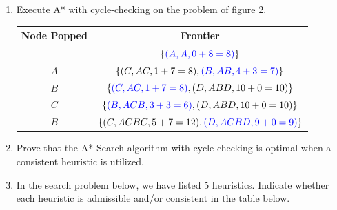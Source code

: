\begin{enumerate}
    \item Execute A* with cycle-checking on the problem of figure 2.

    \begin{solution} \begin{table}[ht!] \color{primary}
        \centering
        \renewcommand{\arraystretch}{1.15}

        \begin{tabular}{||c|c||}
            \hline
            Node Popped & Frontier                                                \\ \hline \hline
                        & $\{ {\color{blue}(A,A, 0+8=8)} \}$                      \\ \hline
            $A$         & $\{ (C,AC, 1+7=8), {\color{blue}(B,AB, 4+3=7)} \}$      \\ \hline
            $B$         & $\{ {\color{blue}(C,AC, 1+7=8)}, (D,ABD, 10+0=10) \}$   \\ \hline
            $C$         & $\{ {\color{blue}(B,ACB, 3+3=6)}, (D,ABD, 10+0=10) \}$  \\ \hline
            $B$         & $\{ (C,ACBC, 5+7=12), {\color{blue}(D,ACBD, 9+0=9)} \}$ \\ \hline
        \end{tabular}
    \end{table} \end{solution}

    \item Prove that the A* Search algorithm with cycle-checking is optimal when a consistent heuristic is utilized.


    \item In the search problem below, we have listed 5 heuristics. Indicate whether each heuristic is admissible and/or consistent in the table below.

    \begin{remark}
    \end{remark}

    \begin{table}[ht!]
        \centering
    

\end{table}
\end{enumerate}
